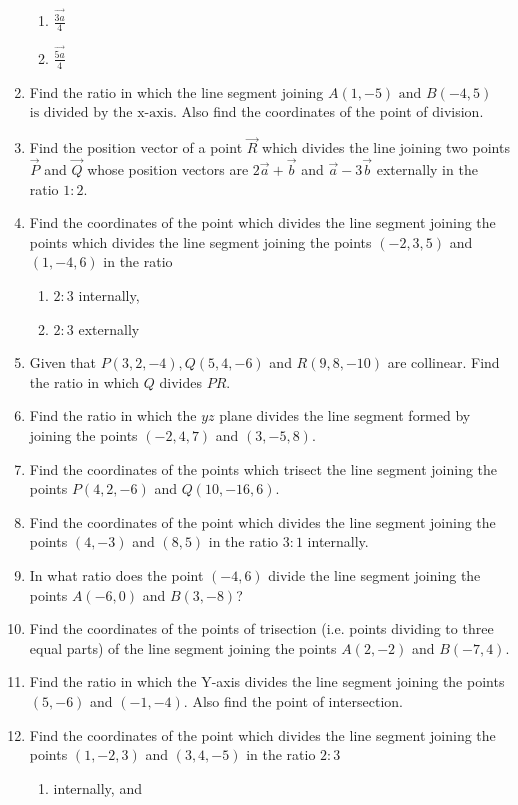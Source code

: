 \begin{enumerate}[label=\thesubsection.\arabic*,ref=\thesubsection.\theenumi]
\begin{enumerate}
\item $\frac{\vec{3a}}{4}$
\item $\frac{\vec{5a}}{4}$
\end{enumerate}
\item Find the ratio in which the line segment joining $A(1,-5) \text{ and } B(-4,5)$ $\text{is divided by the x-axis}$. Also find the coordinates of the point of division.
\item Find the position vector of a point $\vec{R}$ which divides the line joining two points $\vec{P}$ and $\vec{Q}$ whose position vectors are $2\vec{a}+\vec{b}$ and $\vec{a}-3\vec{b}$ externally in the ratio $1:2$.
\item Find the coordinates of the point which divides the line segment joining the points which divides the line segment joining  the points $(-2,3,5)$ and $(1,-4,6)$ in the ratio 
\begin{enumerate}
\item $2:3$ internally,
\item $2:3$ externally
\end{enumerate}
\item Given that $P(3,2,-4), Q(5,4,-6)$ and $R(9,8,-10)$ are collinear. Find the ratio in which $Q$ divides $PR$.
\item Find the ratio in which the $yz$ plane divides the line segment formed by joining the points $(-2,4,7)$ and $(3,-5,8)$.
\item Find the coordinates of the points which trisect the line segment joining the points $P(4,2,-6)$ and $Q(10,-16,6)$.
\item Find the coordinates of the point which divides the line segment joining the points $(4,-3)$ and $(8,5)$ in the ratio $3:1$ internally.
\item In what ratio does the point $(-4,6)$ divide the line segment joining the points $A(-6,0)$ and $B(3,-8)$?
\item Find the coordinates of the points of trisection (i.e. points dividing to three equal parts) of the line segment joining the points $A(2,-2)$ and $B(-7,4)$.
\item Find the ratio in which the Y-axis divides the line segment joining the points $(5,-6)$ and $(-1,-4)$. Also find the point of intersection.
\item Find the coordinates of the point which divides the line segment joining the points $(1,-2,3)$ and $(3,4,-5)$ in the ratio $2:3$
\begin{enumerate}[label=(\roman*)]
\item internally, and

\end{enumerate}
\end{enumerate}
